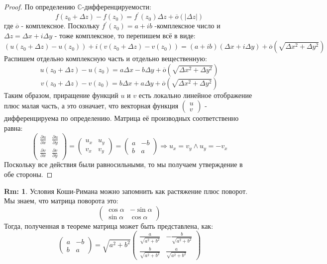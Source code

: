 \documentclass[12pt]{article}
\newcommand{\MC}{\mathbb{C}}
\theoremstyle{definition}
\newtheorem{rem}{Rm:}
\begin{document}
\begin{proof}
	По определению $\MC$-дифференцируемости:
	$$
		f(z_0 + \Delta z) - f(z_0) = f^\prime(z_0) \Delta z + \overline{o}(|\Delta z|)
	$$
	где $\overline{o}$ - комплексное. Поскольку $f^\prime(z_0) = a + ib$ -комплексное число и $\Delta z = \Delta x + i \Delta y$ - тоже комплексное, то перепишем всё в виде:
	$$
		\left(u(z_0 + \Delta z) - u(z_0)\right) + i \left(v(z_0 + \Delta z) - v(z_0)\right) = (a + ib)(\Delta x + i \Delta y) + \overline{o}\left(\sqrt{\Delta x^2 + \Delta y^2}\right)
	$$
	Распишем отдельно комплексную часть и отдельно вещественную:
	$$
		u(z_0 + \Delta z) - u(z_0) = a \Delta x - b \Delta y + \overline{o}\left(\sqrt{\Delta x^2 + \Delta y^2}\right)
	$$
	$$
		v(z_0 + \Delta z) - v(z_0) = b \Delta x + a \Delta y + \overline{o}\left(\sqrt{\Delta x^2 + \Delta y^2}\right)
	$$
	Таким образом, приращение функций $u$ и $v$ есть локально линейное отображение плюс малая часть, а это означает, что векторная функция $\begin{pmatrix}
		u \\
		v
	\end{pmatrix}$ - дифференцируема по определению. Матрица её производных соответственно равна:
	$$
		\begin{pmatrix}
			\tfrac{\partial u}{\partial x} & \tfrac{\partial u}{\partial y} \\[5pt]
			\tfrac{\partial v}{\partial x} & \tfrac{\partial v}{\partial y}
		\end{pmatrix} = 
		\begin{pmatrix}
			u_x & u_y \\
			v_x & v_y
		\end{pmatrix} = 
		\begin{pmatrix}
			a & -b \\
			b & a
		\end{pmatrix} \Rightarrow u_x = v_y \wedge u_y = - v_x
	$$
	Поскольку все действия были равносильными, то мы получаем утверждение в обе стороны.
\end{proof}
\begin{rem}
	Условия Коши-Римана можно запомнить как растяжение плюс поворот. Мы знаем, что матрица поворота это:
	$$
		\begin{pmatrix}
			\cos{\alpha} & -\sin{\alpha}\\
			\sin{\alpha} & \cos{\alpha}
		\end{pmatrix}
	$$
	Тогда, полученная в теореме матрица может быть представлена, как:
	$$
		\begin{pmatrix}
			a & -b \\
			b & a
		\end{pmatrix} = \sqrt{a^2 + b^2} \begin{pmatrix}
		\tfrac{a}{\sqrt{a^2 + b^2}} & -\tfrac{b}{\sqrt{a^2 + b^2}}\\[5pt]
		\tfrac{b}{\sqrt{a^2 + b^2}}& \tfrac{a}{\sqrt{a^2 + b^2}}
	\end{pmatrix}
	$$
\end{rem}
\end{document}
